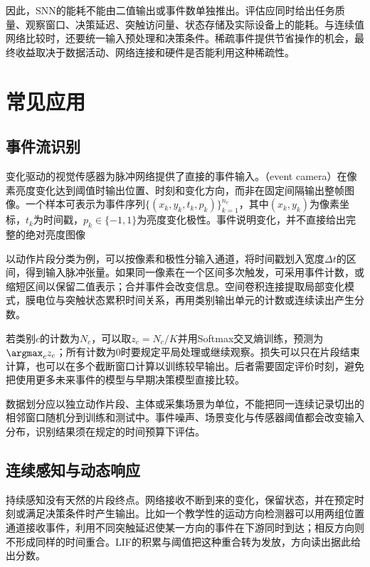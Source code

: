 因此，SNN的能耗不能由二值输出或事件数单独推出。评估应同时给出任务质量、观察窗口、决策延迟、突触访问量、状态存储及实际设备上的能耗。与连续值网络比较时，还要统一输入预处理和决策条件。稀疏事件提供节省操作的机会，最终收益取决于数据活动、网络连接和硬件是否能利用这种稀疏性。

\section{常见应用}
\label{sec:snn-applications}

\subsection{事件流识别}
\label{sec:snn-event-recognition}

变化驱动的视觉传感器为脉冲网络提供了直接的事件输入。（event camera）在像素亮度变化达到阈值时输出位置、时刻和变化方向，而非在固定间隔输出整帧图像。一个样本可表示为事件序列$\{(x_k,y_k,t_k,p_k)\}_{k=1}^{n_e}$，其中$(x_k,y_k)$为像素坐标，$t_k$为时间戳，$p_k\in\{-1,1\}$为亮度变化极性。事件说明变化，并不直接给出完整的绝对亮度图像

以动作片段分类为例，可以按像素和极性分输入通道，将时间戳划入宽度$\Delta t$的区间，得到输入脉冲张量。如果同一像素在一个区间多次触发，可采用事件计数，或缩短区间以保留二值表示；合并事件会改变信息。空间卷积连接提取局部变化模式，膜电位与突触状态累积时间关系，再用类别输出单元的计数或连续读出产生分数。

若类别$c$的计数为$N_c$，可以取$z_c=N_c/K$并用Softmax交叉熵训练，预测为$\argmax_c z_c$；所有计数为0时要规定平局处理或继续观察。损失可以只在片段结束计算，也可以在多个截断窗口计算以训练较早输出。后者需要固定评价时刻，避免把使用更多未来事件的模型与早期决策模型直接比较。

数据划分应以独立动作片段、主体或采集场景为单位，不能把同一连续记录切出的相邻窗口随机分到训练和测试中。事件噪声、场景变化与传感器阈值都会改变输入分布，识别结果须在规定的时间预算下评估。

\subsection{连续感知与动态响应}
\label{sec:snn-continuous-response}

持续感知没有天然的片段终点。网络接收不断到来的变化，保留状态，并在预定时刻或满足决策条件时产生输出。比如一个教学性的运动方向检测器可以用两组位置通道接收事件，利用不同突触延迟使某一方向的事件在下游同时到达；相反方向则不形成同样的时间重合。LIF的积累与阈值把这种重合转为发放，方向读出据此给出分数。

